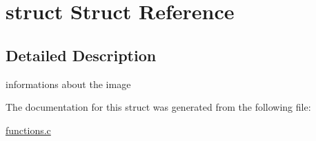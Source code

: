 \hypertarget{structstruct}{}\section{struct Struct Reference}
\label{structstruct}


\subsection{Detailed Description}
informations about the image 

The documentation for this struct was generated from the following file\+:\begin{DoxyCompactItemize}
\item 
\hyperlink{functions_8c}{functions.\+c}\end{DoxyCompactItemize}
